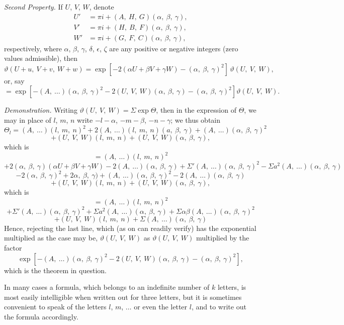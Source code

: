 \documentclass[12pt,a4paper,oneside]{book}
\theoremstyle{plain}
\theoremstyle{definition}
\theoremstyle{remark}
\begin{document}
\newpage
\textit{Second Property.} If $U$, $V$, $W$, denote
\begin{align*}
U'&=\pi i+(A,\ H,\ G)(\alpha,\ \beta,\ \gamma),\\
V'&=\pi i+(H,\ B,\ F)(\alpha,\ \beta,\ \gamma),\\
W'&=\pi i+(G,\ F,\ C)(\alpha,\ \beta,\ \gamma),
\end{align*}
respectively, where $\alpha$, $\beta$, $\gamma$, $\delta$, $\epsilon$, $\zeta$ are any positive or negative integers (zero values admissible), then
\[
\vartheta(U+u,\ V+v,\ W+w)=\exp\left[-2(\alpha U+\beta V+\gamma W)-(\alpha,\ \beta,\ \gamma)^2\right]\,\vartheta(U,\ V,\ W),
\]
or, say
\[
=\exp\left[-(A,\ \dots)(\alpha,\ \beta,\ \gamma)^2-2(U,\ V,\ W)(\alpha,\ \beta,\ \gamma)-(\alpha,\ \beta,\ \gamma)^2\right]\vartheta(U,\ V,\ W).
\]

\textit{Demonstration.} Writing $\vartheta(U,\ V,\ W)=\Sigma\exp\Theta$, then in the expression of $\Theta$, we may in place of $l$, $m$, $n$ write $-l-\alpha$, $-m-\beta$, $-n-\gamma$; we thus obtain
\[
\Theta_l=(A,\ \dots)(l,\ m,\ n)^2+2(A,\ \dots)(l,\ m,\ n)(a,\ \beta,\ \gamma)+(A,\ \dots)(\alpha,\ \beta,\ \gamma)^2
\]
\[
+(U,\ V,\ W)(l,\ m,\ n)+(U,\ V,\ W)(\alpha,\ \beta,\ \gamma),
\]
which is
\[
=(A,\ \dots)(l,\ m,\ n)^2
\]
\[
+2(\alpha,\ \beta,\ \gamma)(\alpha U+\beta V+\gamma W)-2(A,\ \dots)(\alpha,\ \beta,\ \gamma)+\Sigma'(A,\ \dots)(\alpha,\ \beta,\ \gamma)^2-\Sigma a^2(A,\ \dots)(\alpha,\ \beta,\ \gamma)
\]
\[
-2(\alpha,\ \beta,\ \gamma)^2+2\alpha,\ \beta,\ \gamma)+(A,\ \dots)(\alpha,\ \beta,\ \gamma)^2-2(A,\ \dots)(\alpha,\ \beta,\ \gamma)
\]
\[
+(U,\ V,\ W)(l,\ m,\ n)+(U,\ V,\ W)(\alpha,\ \beta,\ \gamma),
\]
which is
\[
=(A,\ \dots)(l,\ m,\ n)^2
\]
\[
+\Sigma'(A,\ \dots)(\alpha,\ \beta,\ \gamma)^2+\Sigma a^2(A,\ \dots)(\alpha,\ \beta,\ \gamma)+\Sigma\alpha\beta(A,\ \dots)(\alpha,\ \beta,\ \gamma)^2
\]
\[
+(U,\ V,\ W)(l,\ m,\ n)+\Sigma(A,\ \dots)(\alpha,\ \beta,\ \gamma)
\]
Hence, rejecting the last line, which (as on can readily verify) has the exponential multiplied as the case may be, $\vartheta(U,\ V,\ W)$ as $\vartheta(U,\ V,\ W)$ multiplied by the factor
\[
\exp\left[-(A,\ \dots)(\alpha,\ \beta,\ \gamma)^2-2(U,\ V,\ W)(\alpha,\ \beta,\ \gamma)-(\alpha,\ \beta,\ \gamma)^2\right],
\]
which is the theorem in question.

In many cases a formula, which belongs to an indefinite number of $k$ letters, is most easily intelligible when written out for three letters, but it is sometimes convenient to speak of the letters $l$, $m$, $\dots$ or even the letter $l$, and to write out the formula accordingly.
\end{document}
